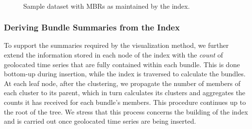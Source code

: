 \begin{figure}[!t]
 \centering
 \
\caption{Sample dataset with MBRs as maintained by the \btsr index.}
\label{fig:trees}
\end{figure}



\subsubsection{Deriving Bundle Summaries from the \btsr Index}
\label{subsec:visualization}

To support the summaries required by the visualization method, we further extend the information stored in each node of the \btsr index with the {\em count} of geolocated time series that are fully contained within each bundle. This is done bottom-up during insertion, while the index is traversed to calculate the bundles. At each leaf node, after the clustering, we propagate the number of members of each cluster to its parent, which in turn calculates its clusters and aggregates the counts it has received for each bundle's members. This procedure continues up to the root of the tree. We stress that this process concerns the building of the index and is carried out once geolocated time series are being inserted.


